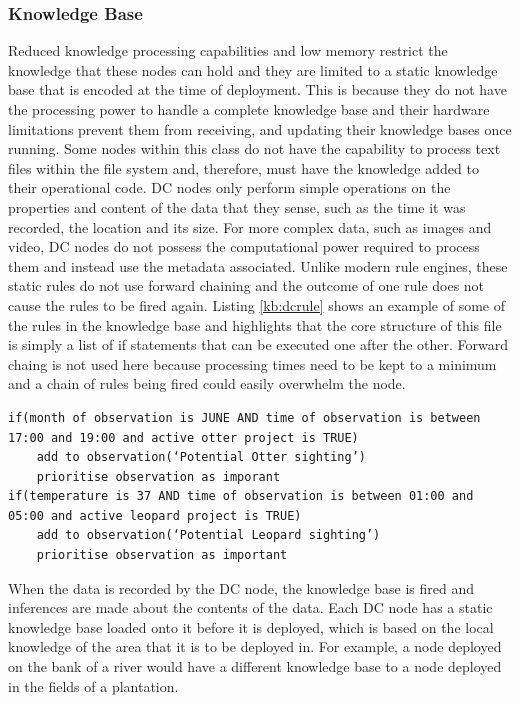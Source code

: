 	\subsubsection{Knowledge Base}
	Reduced knowledge processing capabilities and low memory restrict the knowledge that these nodes can hold and they are limited to a static knowledge base that is encoded at the time of deployment. This is because they do not have the processing power to handle a complete knowledge base and their hardware limitations prevent them from receiving, and updating their knowledge bases once running. Some nodes within this class do not have the capability to process text files within the file system and, therefore, must have the knowledge added to their operational code. DC nodes only perform simple operations on the properties and content of the data that they sense, such as the time it was recorded, the location and its size. For more complex data, such as images and video, DC nodes do not possess the computational power required to process them and instead use the metadata associated.
	Unlike modern rule engines, these static rules do not use forward chaining and the outcome of one rule does not cause the rules to be fired again. Listing \ref{kb:dcrule} shows an example of some of the rules in the knowledge base and highlights that the core structure of this file is simply a list of if statements that can be executed one after the other. Forward chaing is not used here because processing times need to be kept to a minimum and a chain of rules being fired could easily overwhelm the node. 

\begin{lstlisting}[breaklines=true, caption={Example DC Node Rules}, label={kb:dcrule}]
if(month of observation is JUNE AND time of observation is between 17:00 and 19:00 and active otter project is TRUE)
	add to observation(‘Potential Otter sighting’)
	prioritise observation as imporant
if(temperature is 37 AND time of observation is between 01:00 and 05:00 and active leopard project is TRUE)
	add to observation(‘Potential Leopard sighting’)
	prioritise observation as important
\end{lstlisting}

When the data is recorded by the DC node, the knowledge base is fired and inferences are made about the contents of the data. Each DC node has a static knowledge base loaded onto it before it is deployed, which is based on the local knowledge of the area that it is to be deployed in.  For example, a node deployed on the bank of a river would have a different knowledge base to a node deployed in the fields of a plantation.

